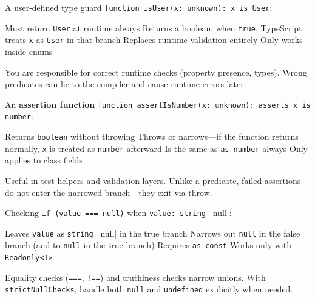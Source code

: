 \question[4]
A user-defined type guard \lstinline[style=tsinline]|function isUser(x: unknown): x is User|:
\begin{choices}
  \choice Must return \lstinline[style=tsinline]|User| at runtime always
  \CorrectChoice Returns a boolean; when \texttt{true}, TypeScript treats \lstinline[style=tsinline]|x| as \lstinline[style=tsinline]|User| in that branch
  \choice Replaces runtime validation entirely
  \choice Only works inside enums
\end{choices}
\begin{solution}
  You are responsible for correct runtime checks (property presence, types). Wrong predicates can lie to the compiler and cause runtime errors later.
\end{solution}

\question[4]
An \textbf{assertion function} \lstinline[style=tsinline]|function assertIsNumber(x: unknown): asserts x is number|:
\begin{choices}
  \choice Returns \lstinline[style=tsinline]|boolean| without throwing
  \CorrectChoice Throws or narrows---if the function returns normally, \lstinline[style=tsinline]|x| is treated as \lstinline[style=tsinline]|number| afterward
  \choice Is the same as \lstinline[style=tsinline]|as number| always
  \choice Only applies to class fields
\end{choices}
\begin{solution}
  Useful in test helpers and validation layers. Unlike a predicate, failed assertions do not enter the narrowed branch---they exit via throw.
\end{solution}

\question[4]
Checking \lstinline[style=tsinline]|if (value === null)| when \lstinline[style=tsinline]|value: string | null|:
\begin{choices}
  \choice Leaves \lstinline[style=tsinline]|value| as \lstinline[style=tsinline]|string | null| in the true branch
  \CorrectChoice Narrows out \lstinline[style=tsinline]|null| in the false branch (and to \lstinline[style=tsinline]|null| in the true branch)
  \choice Requires \lstinline[style=tsinline]|as const|
  \choice Works only with \lstinline[style=tsinline]|Readonly<T>|
\end{choices}
\begin{solution}
  Equality checks (\lstinline[style=tsinline]|===|, \lstinline[style=tsinline]|!==|) and truthiness checks narrow unions. With \texttt{strictNullChecks}, handle both \lstinline[style=tsinline]|null| and \lstinline[style=tsinline]|undefined| explicitly when needed.
\end{solution}

